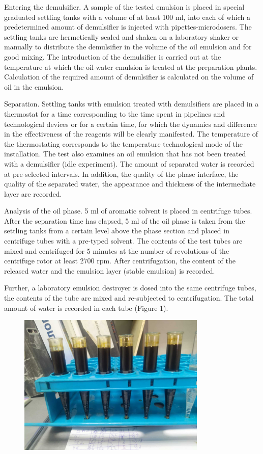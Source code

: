 Entering the demulsifier. A sample of the tested emulsion is placed in
special graduated settling tanks with a volume of at least 100 ml, into
each of which a predetermined amount of demulsifier is injected with
pipettes-microdosers. The settling tanks are hermetically sealed and
shaken on a laboratory shaker or manually to distribute the demulsifier
in the volume of the oil emulsion and for good mixing. The introduction
of the demulsifier is carried out at the temperature at which the
oil-water emulsion is treated at the preparation plants. Calculation of
the required amount of demulsifier is calculated on the volume of oil in
the emulsion.

Separation. Settling tanks with emulsion treated with demulsifiers are
placed in a thermostat for a time corresponding to the time spent in
pipelines and technological devices or for a certain time, for which the
dynamics and difference in the effectiveness of the reagents will be
clearly manifested. The temperature of the thermostating corresponds to
the temperature technological mode of the installation. The test also
examines an oil emulsion that has not been treated with a demulsifier
(idle experiment). The amount of separated water is recorded at
pre-selected intervals. In addition, the quality of the phase interface,
the quality of the separated water, the appearance and thickness of the
intermediate layer are recorded.

Analysis of the oil phase. 5 ml of aromatic solvent is placed in
centrifuge tubes. After the separation time has elapsed, 5 ml of the oil
phase is taken from the settling tanks from a certain level above the
phase section and placed in centrifuge tubes with a pre-typed solvent.
The contents of the test tubes are mixed and centrifuged for 5 minutes
at the number of revolutions of the centrifuge rotor at least 2700 rpm.
After centrifugation, the content of the released water and the emulsion
layer (stable emulsion) is recorded.

Further, a laboratory emulsion destroyer is dosed into the same
centrifuge tubes, the contents of the tube are mixed and re-subjected to
centrifugation. The total amount of water is recorded in each tube
(Figure 1).

\begin{figure}[H]
	\centering
	\includegraphics[width=0.8\textwidth]{assets/1075}
	\caption*{}
\end{figure}

